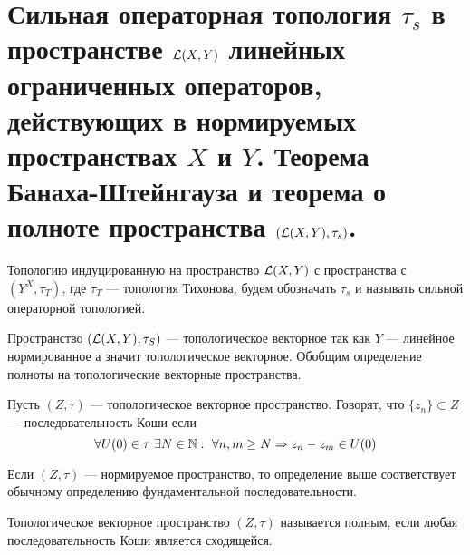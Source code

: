 \newpage
\section{Сильная операторная топология $\tau_s$ в пространстве $\mathcal{L}(X,Y)$ линейных ограниченных операторов, действующих в нормируемых пространствах $X$ и $Y$. Теорема Банаха-Штейнгауза и теорема о полноте пространства $(\mathcal{L}(X,Y), \tau_s)$.}

\begin{definition}
	Топологию индуцированную на пространство $\mathcal{L}(X,Y)$ с пространства с $(Y^X, \tau_T)$, где $\tau_T$ --- топология Тихонова, будем обозначать $\tau_s$ и называть сильной операторной топологией. 
\end{definition}

Пространство $(\mathcal{L}(X,Y), \tau_S)$ --- топологическое векторное так как $Y$ --- линейное нормированное а значит топологическое векторное. Обобщим определение полноты на топологические векторные пространства.
\begin{definition}
	Пусть $(Z, \tau)$ --- топологическое векторное пространство. Говорят, что $\{z_n\} \subset Z$ --- последовательность Коши если
	$$
	\forall U(0) \in \tau \ \exists N \in \mathbb{N}: \ \forall n,m \geq N \Rightarrow z_n - z_m \in U(0)
	$$
\end{definition}
\begin{remark}
	Если $(Z, \tau)$ --- нормируемое пространство, то определение выше соответствует обычному определению фундаментальной последовательности.
\end{remark}

\begin{definition}
	Топологическое векторное пространство $(Z, \tau)$ называется полным, если любая последовательность Коши является сходящейся. 
\end{definition}

